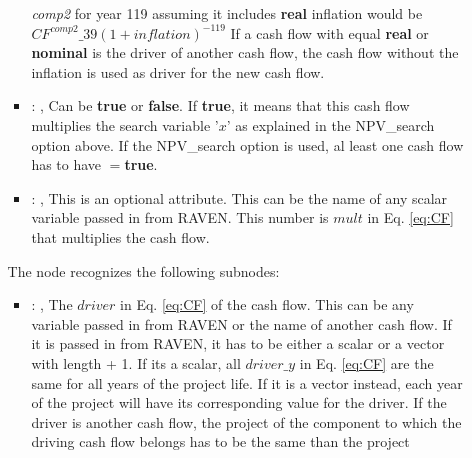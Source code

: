 \begin{itemize}
\begin{itemize}
\begin{itemize}
                \textit{comp2} for year 119 assuming it includes \textbf{real}
                inflation would be $CF^{comp2}\_{39}(1+inflation)^{-119}$
                If a cash flow with  equal \textbf{real} or \textbf{nominal} is
                the driver of another cash flow, the cash flow without
                the inflation is used as driver for the new cash flow.
              \item {}: , 
                Can be \textbf{true} or \textbf{false}. If \textbf{true}, it means that this cash
                flow multiplies                               the search variable '$x$' as explained
                in the NPV\_search option above.                               If the NPV\_search
                option is used, al least one cash flow has to have
                $=$\textbf{true}.
              \item {}: , 
                This is an optional attribute. This can be the name of any scalar variable passed in
                from RAVEN. This number                                 is $mult$ in Eq. \ref{eq:CF}
                that multiplies the cash flow.
          \end{itemize}

          The  node recognizes the following subnodes:
          \begin{itemize}
            \item {}: , 
              The $driver$ in Eq. \ref{eq:CF} of the cash flow. This can be any variable passed in
              from RAVEN or the name                               of another cash flow. If it is
              passed in from RAVEN, it has to be either a scalar or a vector with length
               + 1.                               If its a scalar, all
              $driver\_{y}$ in Eq. \ref{eq:CF}  are the same for all years of the project life. If it
              is a vector instead, each                               year of the project
               will have its corresponding value for the driver. If the driver
              is another                               cash flow, the project 
              of the component to which the driving cash flow belongs has to be the same than the
              project


\end{itemize}
\end{itemize}
\end{itemize}
